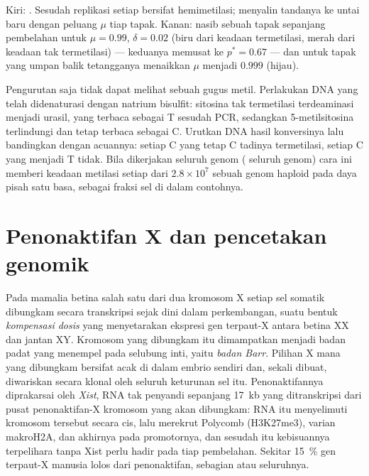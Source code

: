 \begin{omfigure}
{\small Kiri: . Sesudah replikasi setiap  bersifat
hemimetilasi;  menyalin tandanya ke untai baru dengan peluang $\mu$ tiap
tapak. Kanan: nasib sebuah tapak sepanjang pembelahan untuk $\mu = 0.99$,
$\delta = 0.02$ (biru dari keadaan termetilasi, merah dari keadaan tak
termetilasi) --- keduanya memusat ke $p^{*} = 0.67$ --- dan untuk tapak yang
umpan balik tetangganya menaikkan $\mu$ menjadi $0.999$ (hijau).}
\end{omfigure}

\begin{method}\label{met:b3:chromatin-epigenetics:bisulfite}
Pengurutan saja tidak dapat melihat sebuah gugus metil. Perlakukan DNA yang
telah didenaturasi dengan natrium bisulfit: sitosina tak termetilasi
terdeaminasi menjadi urasil, yang terbaca sebagai T sesudah PCR, sedangkan
5-metilsitosina terlindungi dan tetap terbaca sebagai C. Urutkan DNA hasil
konversinya lalu bandingkan dengan acuannya: setiap C yang tetap C tadinya
termetilasi, setiap C yang menjadi T tidak. Bila dikerjakan seluruh genom
( seluruh genom) cara ini memberi keadaan metilasi setiap
dari $2.8\times 10^{7}$  sebuah genom haploid pada daya pisah satu basa,
sebagai fraksi sel di dalam contohnya.
\end{method}

\section{Penonaktifan X dan pencetakan genomik}

\begin{definition}\label{def:b3:chromatin-epigenetics:x-inactivation}
Pada mamalia betina salah satu dari dua kromosom X setiap sel somatik
dibungkam secara transkripsi sejak dini dalam perkembangan, suatu bentuk
\emph{kompensasi dosis} yang menyetarakan ekspresi gen terpaut-X antara betina
XX dan jantan XY. Kromosom yang dibungkam itu dimampatkan menjadi badan padat
yang menempel pada selubung inti, yaitu \emph{badan Barr}. Pilihan X mana yang
dibungkam bersifat acak di dalam embrio sendiri dan, sekali dibuat, diwariskan
secara klonal oleh seluruh keturunan sel itu. Penonaktifannya diprakarsai oleh
\emph{Xist}, RNA tak penyandi sepanjang \qty{17}{kb} yang ditranskripsi dari
pusat penonaktifan-X kromosom yang akan dibungkam: RNA itu menyelimuti
kromosom tersebut secara cis, lalu merekrut Polycomb (H3K27me3), varian
 makroH2A, dan akhirnya  pada promotornya, dan sesudah itu
kebisuannya terpelihara tanpa Xist perlu hadir pada tiap pembelahan. Sekitar
\qty{15}{\%} gen terpaut-X manusia lolos dari penonaktifan, sebagian atau
seluruhnya.
\end{definition}

